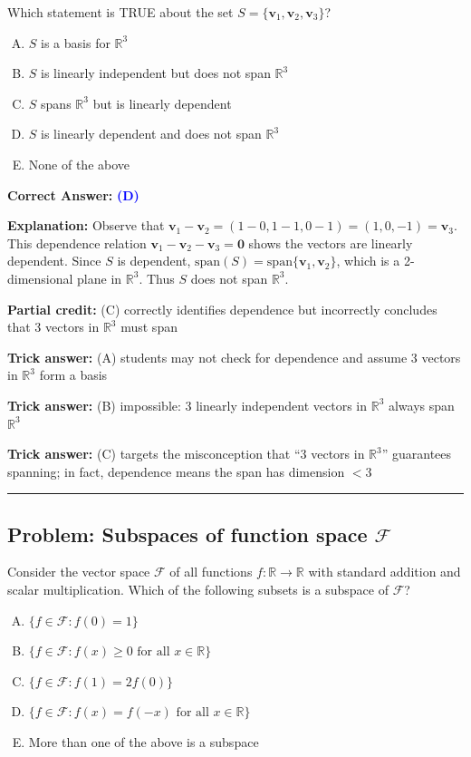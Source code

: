 \documentclass[12pt]{amsart}
\newcommand{\divider}{
  \vspace{-1em}
  \noindent
  \raisebox{-0.15ex}{\textbullet}%
  \hspace{0.5em}%
  \rule[0.5ex]{0.95\textwidth}{1.0pt}%
  \hspace{0.5em}%
  \raisebox{-0.15ex}{\textbullet}%
  \vspace{0em}
}
\begin{document}
Which statement is TRUE about the set $S = \{\mathbf{v}_1, \mathbf{v}_2, \mathbf{v}_3\}$?

\begin{enumerate}[(A)]
\item $S$ is a basis for $\mathbb{R}^3$
\item $S$ is linearly independent but does not span $\mathbb{R}^3$
\item $S$ spans $\mathbb{R}^3$ but is linearly dependent
\item $S$ is linearly dependent and does not span $\mathbb{R}^3$
\item None of the above
\end{enumerate}

\textbf{Correct Answer:} \textcolor{blue}{\textbf{(D)}}

\textbf{Explanation:} Observe that $\mathbf{v}_1 - \mathbf{v}_2 = (1-0, 1-1, 0-1) = (1, 0, -1) = \mathbf{v}_3$. This dependence relation $\mathbf{v}_1 - \mathbf{v}_2 - \mathbf{v}_3 = \mathbf{0}$ shows the vectors are linearly dependent. Since $S$ is dependent, $\text{span}(S) = \text{span}\{\mathbf{v}_1, \mathbf{v}_2\}$, which is a 2-dimensional plane in $\mathbb{R}^3$. Thus $S$ does not span $\mathbb{R}^3$.

\textbf{Partial credit:} (C) correctly identifies dependence but incorrectly concludes that 3 vectors in $\mathbb{R}^3$ must span

\textbf{Trick answer:} (A) students may not check for dependence and assume 3 vectors in $\mathbb{R}^3$ form a basis

\textbf{Trick answer:} (B) impossible: 3 linearly independent vectors in $\mathbb{R}^3$ always span $\mathbb{R}^3$

\textbf{Trick answer:} (C) targets the misconception that ``3 vectors in $\mathbb{R}^3$'' guarantees spanning; in fact, dependence means the span has dimension $< 3$

\divider

\subsection*{Problem: Subspaces of function space $\mathcal{F}$}

Consider the vector space $\mathcal{F}$ of all functions $f: \mathbb{R} \to \mathbb{R}$ with standard addition and scalar multiplication. Which of the following subsets is a subspace of $\mathcal{F}$?

\begin{enumerate}[(A)]
\item $\{f \in \mathcal{F} : f(0) = 1\}$
\item $\{f \in \mathcal{F} : f(x) \geq 0 \text{ for all } x \in \mathbb{R}\}$
\item $\{f \in \mathcal{F} : f(1) = 2f(0)\}$
\item $\{f \in \mathcal{F} : f(x) = f(-x) \text{ for all } x \in \mathbb{R}\}$
\item More than one of the above is a subspace
\end{enumerate}
\end{document}
